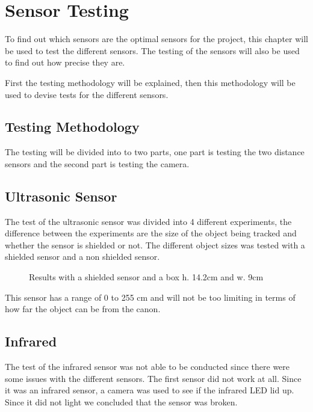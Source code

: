 \section{Sensor Testing} 
To find out which sensors are the optimal sensors for the project,
this chapter will be used to test the different sensors. The testing of the
sensors will also be used to find out how precise they are.\nl

First the testing methodology will be explained, then this methodology
will be used to devise tests for the different sensors. 

\subsection{Testing Methodology}
The testing will be divided into to two parts, one part is testing the two
distance sensors and the second part is testing the camera. 

\subsection{Ultrasonic Sensor}
The test of the ultrasonic sensor was divided into 4 different experiments, the
difference between the experiments are the size of the object being tracked and
whether the sensor is shielded or not. The different object sizes was tested
with a shielded sensor and a non shielded sensor. \nl

\begin{figure}
\centering
{}
\caption{Results with a shielded sensor and a box h. 14.2cm and w. 9cm}
\end{figure}

This sensor has a range of 0 to 255 cm and will not be too limiting in terms of
how far the object can be from the canon. 

\subsection{Infrared}
The test of the infrared sensor was not able to be conducted since there were
some issues with the different sensors. The first sensor did not work at all.
Since it was an infrared sensor, a camera was used to see if the infrared
LED lid up. Since it did not light we concluded that the sensor was broken. \nl


